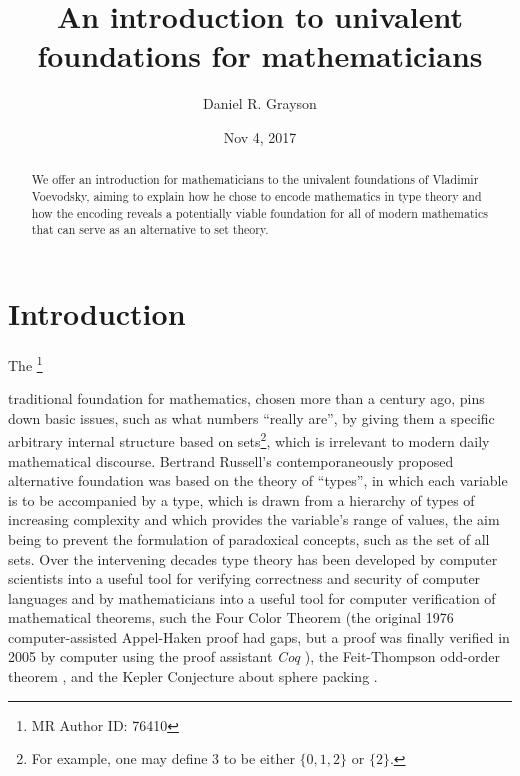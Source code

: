 \documentclass[letter,12pt]{amsart}
\newcommand{\mytitle}{An introduction to univalent foundations for mathematicians}
\newcommand{\myauthor}{Daniel R. Grayson}
\theoremstyle{definition}
\theoremstyle{remark}
\numberwithin{equation}{section}
\newcommand\blfootnote[1]{%
  \begingroup
  \renewcommand\thefootnote{}\footnote{#1}%
  \addtocounter{footnote}{-1}%
  \endgroup}
\begin{document}
\title{\mytitle}
\author{\myauthor}
\address{2409 S.{} Vine St., Urbana, IL 61801, USA}
\date{Nov 4, 2017}

\begin{abstract}
  We offer an introduction for mathematicians to the univalent foundations of Vladimir Voevodsky, aiming to explain how he chose to encode
  mathematics in type theory and how the encoding reveals a potentially viable foundation for all of modern mathematics that can serve as an
  alternative to set theory.
\end{abstract}

\maketitle


\tableofcontents

\newpage
\section*{Introduction}

The\blfootnote{MR Author ID: 76410} traditional foundation for mathematics, chosen more than a century ago, pins down basic issues, such as what
numbers ``really are'', by giving them a specific arbitrary internal structure based on sets\footnote{For example, one may define $3$ to
  be either $\{0,1,2\}$ or $\{2\}$.}, which is irrelevant to modern daily mathematical
discourse.  Bertrand Russell's contemporaneously proposed alternative foundation \citep{MR1506041} was based on the theory of ``types'', in
which each variable is to be accompanied by a type, which is drawn from a hierarchy of types of increasing complexity and which provides the
variable's range of values, the aim being to prevent the formulation of paradoxical concepts, such as the set of all sets.  Over the intervening
decades type theory has been developed by computer scientists into a useful tool for verifying correctness and security of computer languages and by
mathematicians into a useful tool for computer verification of mathematical theorems, such the Four Color Theorem (the original 1976
computer-assisted \citep{10.2307/986491} Appel-Haken proof \citep{MR0543792,MR0543793} had gaps, but a proof was finally verified
\citep{MR2463991} in 2005 by computer using the proof assistant {\em Coq} \citep{Coq}), the Feit-Thompson odd-order theorem
\citep{10.1007/978-3-642-39634-2_14}, and the Kepler Conjecture about sphere packing \citep{kepler}.
\end{document}
